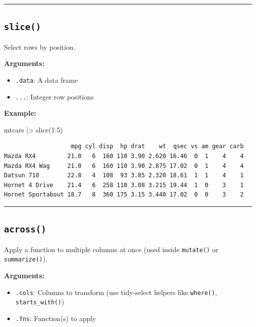 \documentclass[
  letterpaper,
  DIV=11,
  numbers=noendperiod]{scrreprt}
\newenvironment{Shaded}{\begin{snugshade}}{\end{snugshade}}
\newcommand{\DecValTok}[1]{\textcolor[rgb]{0.68,0.00,0.00}{#1}}
\newcommand{\FunctionTok}[1]{\textcolor[rgb]{0.28,0.35,0.67}{#1}}
\newcommand{\NormalTok}[1]{\textcolor[rgb]{0.00,0.23,0.31}{#1}}
\newcommand{\SpecialCharTok}[1]{\textcolor[rgb]{0.37,0.37,0.37}{#1}}
\providecommand{\tightlist}{%
  \setlength{\itemsep}{0pt}\setlength{\parskip}{0pt}}
\begin{document}
\begin{center}\rule{0.5\linewidth}{0.5pt}\end{center}

\subsection{\texorpdfstring{\texttt{slice()}}{slice()}}\label{slice}

Select rows by position.

\textbf{Arguments:}

\begin{itemize}
\tightlist
\item
  \texttt{.data}: A data frame
\item
  \texttt{...}: Integer row positions
\end{itemize}

\textbf{Example:}

\begin{Shaded}
\begin{Highlighting}[]
\NormalTok{mtcars }\SpecialCharTok{|\textgreater{}}
  \FunctionTok{slice}\NormalTok{(}\DecValTok{1}\SpecialCharTok{:}\DecValTok{5}\NormalTok{)}
\end{Highlighting}
\end{Shaded}

\begin{verbatim}
                   mpg cyl disp  hp drat    wt  qsec vs am gear carb
Mazda RX4         21.0   6  160 110 3.90 2.620 16.46  0  1    4    4
Mazda RX4 Wag     21.0   6  160 110 3.90 2.875 17.02  0  1    4    4
Datsun 710        22.8   4  108  93 3.85 2.320 18.61  1  1    4    1
Hornet 4 Drive    21.4   6  258 110 3.08 3.215 19.44  1  0    3    1
Hornet Sportabout 18.7   8  360 175 3.15 3.440 17.02  0  0    3    2
\end{verbatim}

\begin{center}\rule{0.5\linewidth}{0.5pt}\end{center}

\subsection{\texorpdfstring{\texttt{across()}}{across()}}\label{across}

Apply a function to multiple columns at once (used inside
\texttt{mutate()} or \texttt{summarize()}).

\textbf{Arguments:}

\begin{itemize}
\tightlist
\item
  \texttt{.cols}: Columns to transform (use tidy-select helpers like
  \texttt{where()}, \texttt{starts\_with()})
\item
  \texttt{.fns}: Function(s) to apply
\end{itemize}
\end{document}
